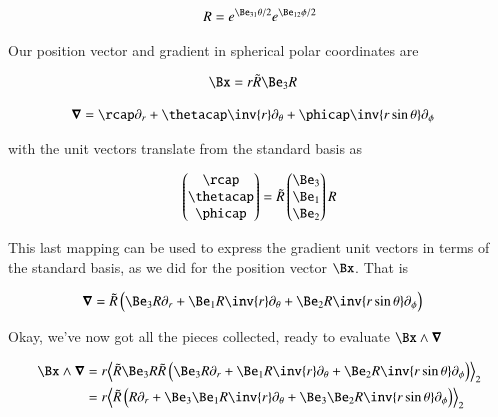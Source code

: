\begin{align}\label{eqn:qmAngularMom:angExp1}
R = e^{\Be_{31}\theta/2} e^{\Be_{12}\phi/2}
\end{align}

Our position vector and gradient in spherical polar coordinates are

\begin{align}\label{eqn:qmAngularMom:angExp2}
\Bx &= r \tilde{R} \Be_3 R 
\end{align}

\begin{align}\label{eqn:qmAngularMom:angExp3}
\spacegrad &= \rcap \partial_r + \thetacap \inv{r} \partial_\theta + \phicap \inv{r \sin\theta} \partial_\phi
\end{align}

with the unit vectors translate from the standard basis as

\begin{align}\label{eqn:qmAngularMom:angExp4}
\begin{pmatrix}
\rcap \\
\thetacap \\
\phicap \\
\end{pmatrix}
=
\tilde{R}
\begin{pmatrix}
\Be_3 \\
\Be_1 \\
\Be_2 \\
\end{pmatrix}
R
\end{align}

This last mapping can be used to express the gradient unit vectors in terms of the standard basis, as we did for the position vector $\Bx$.  That is

\begin{align}\label{eqn:qmAngularMom:angExp5}
\spacegrad &= \tilde{R} \left( \Be_3 R \partial_r + \Be_1 R \inv{r} \partial_\theta + \Be_2 R \inv{r \sin\theta} \partial_\phi \right)
\end{align}

Okay, we've now got all the pieces collected, ready to evaluate $\Bx \wedge \spacegrad$

\begin{align*}
\Bx \wedge \spacegrad 
&=
r \gpgradetwo{\tilde{R} \Be_3 R 
\tilde{R} \left( \Be_3 R \partial_r + \Be_1 R \inv{r} \partial_\theta + \Be_2 R \inv{r \sin\theta} \partial_\phi \right) } \\
&=
r \gpgradetwo{\tilde{R} \left( R \partial_r + \Be_3 \Be_1 R \inv{r} \partial_\theta + \Be_3 \Be_2 R \inv{r \sin\theta} \partial_\phi \right) } \\
\end{align*}

